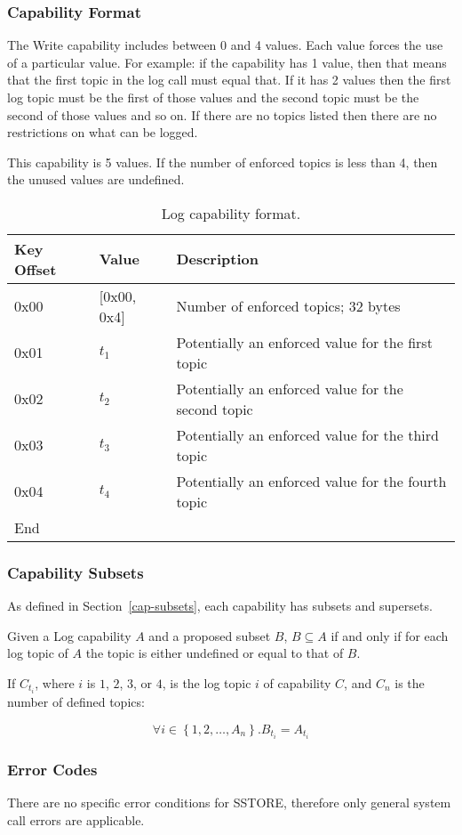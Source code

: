 \documentclass[english,a4paper]{article}
\let\oldparagraph\subsubsection
\renewcommand{\subsubsection}[1]{\oldparagraph{#1}\mbox{}}
\begin{document}
\subsubsection{Capability Format}
The Write capability includes between 0 and 4 values. Each value forces the use
of a particular value. For example: if the capability has 1 value, then that
means that the first topic in the log call must equal that. If it has 2 values
then the first log topic must be the first of those values and the second topic
must be the second of those values and so on. If there are no topics listed then
there are no restrictions on what can be logged.

This capability is 5 values. If the number of enforced topics is less than 4,
then the unused values are undefined.

\begin{table}[H]
  \caption{Log capability format.}
  \centering{}%
  \begin{tabular}{l|l|p{}}
    \hline
    Key Offset & Value & Description\tabularnewline
    \hline
    \hline
    0x00 & [0x00, 0x4] & Number of enforced topics; 32 bytes \tabularnewline
    0x01 & $t_1$ & Potentially an enforced value for the first topic
      \tabularnewline
    0x02 & $t_2$ & Potentially an enforced value for the second topic
      \tabularnewline
    0x03 & $t_3$ & Potentially an enforced value for the third topic
      \tabularnewline
    0x04 & $t_4$ & Potentially an enforced value for the fourth topic
      \tabularnewline
    \hline
    End &  \tabularnewline
    \hline
  \end{tabular}
\end{table}

\subsubsection{Capability Subsets}
As defined in Section~\ref{cap-subsets}, each capability has subsets and
supersets.

Given a Log capability $A$ and a proposed subset $B$, $B \subseteq A$ if and
only if for each log topic of $A$ the topic is either undefined or equal to that
of $B$.

If $C_{t_i}$, where $i$ is $1$, $2$, $3$, or $4$, is the log topic $i$ of
capability $C$, and $C_n$ is the number of defined topics:

$$ \forall i \in \left\{1,2,\dots ,A_n\right\}. B_{t_i} = A_{t_i} $$

\subsubsection{Error Codes}
There are no specific error conditions for SSTORE, therefore only general system
call errors are applicable.
\end{document}
